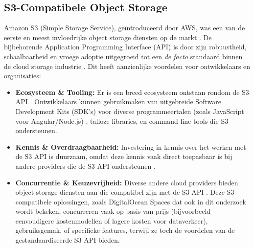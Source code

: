 \subsection{S3-Compatibele Object Storage}
Amazon S3 (Simple Storage Service), geïntroduceerd door AWS, was een van de eerste en meest invloedrijke object storage diensten op de markt \cite{S3CompatAngularIntro}. %
De bijbehorende Application Programming Interface (API) is door zijn robuustheid, schaalbaarheid en vroege adoptie uitgegroeid tot een \textit{de facto} standaard binnen de cloud storage industrie \cite{S3CompatAngularStandard}. %
Dit heeft aanzienlijke voordelen voor ontwikkelaars en organisaties:

\begin{itemize}
    \item \textbf{Ecosysteem \& Tooling:} Er is een breed ecosysteem ontstaan rondom de S3 API \cite{S3CompatAngularEcosystem}. %
    Ontwikkelaars kunnen gebruikmaken van uitgebreide Software Development Kits (SDK's) voor diverse programmeertalen (zoals JavaScript voor Angular/Node.js) \cite{S3CompatAngularSDKs}, %
    talloze libraries, en command-line tools die S3 ondersteunen.
    \item \textbf{Kennis \& Overdraagbaarheid:} Investering in kennis over het werken met de S3 API is duurzaam, omdat deze kennis vaak direct toepasbaar is bij andere providers die de S3 API ondersteunen \cite{S3CompatAngularKnowledgeTransfer}. %
    \item \textbf{Concurrentie \& Keuzevrijheid:} Diverse andere cloud providers bieden object storage diensten aan die compatibel zijn met de S3 API \cite{S3CompatAngularOtherProviders}. %
    Deze S3-compatibele oplossingen, zoals DigitalOcean Spaces \cite{BPVoorstelDOSpaces} %
    dat ook in dit onderzoek wordt bekeken, concurreren vaak op basis van prijs (bijvoorbeeld eenvoudigere kostenmodellen \cite{S3CompatAngularPricing} %
    of lagere kosten voor dataverkeer), gebruiksgemak, of specifieke features, terwijl ze toch de voordelen van de gestandaardiseerde S3 API bieden.
\end{itemize}

